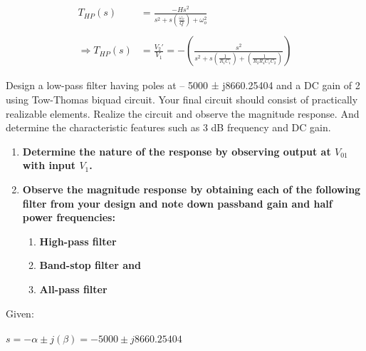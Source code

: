 \documentclass[a4paper,11pt]{article}
\newcommand\ddfrac[2]{\frac{\displaystyle #1}{\displaystyle #2}}
\begin{document}
\begin{equation*}
    \begin{aligned}
        T_{HP}(s)             & =\ddfrac{-Hs^2}{s^2+s\left(\frac{\omega_o}{Q}\right)+\omega_o^2}                                                       \\\\
        \Rightarrow T_{HP}(s) & =\frac{V_2'}{V_{1}}=-\left(\ddfrac{s^2}{s^2+s\left(\frac{1}{R_1C_1}\right)+\left(\frac{1}{R_2R_4C_1C_2}\right)}\right)
    \end{aligned}
\end{equation*}



\begin{Q}
    {
        Design a low-pass filter having poles at – 5000 ± j8660.25404 and a DC gain of 2 using Tow-Thomas biquad circuit. Your final circuit should consist of practically realizable elements. Realize the circuit and observe the magnitude response. And determine the characteristic features such as 3 dB frequency and DC gain.
        \begin{enumerate}
            \item\textbf{ Determine the nature of the response by observing output at $V_{01}$ with input $V_{1}$. }
            \item\textbf{ Observe the magnitude response by obtaining each of the following filter from your design and note down passband gain and half power frequencies: }
            \begin{enumerate}
                \item\textbf{	High-pass filter}
                \item\textbf{	Band-stop filter and}
                \item\textbf{   All-pass filter}
            \end{enumerate}
        \end{enumerate} }
\end{Q}

Given:\\\\
$s=-\alpha \pm j(\beta) = -5000 \pm j8660.25404$\\
\end{document}
